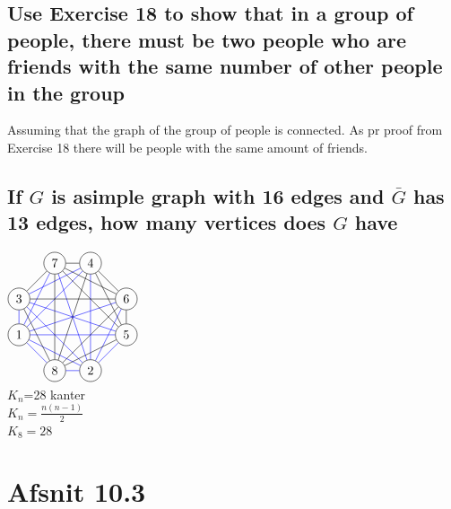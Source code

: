 \documentclass[12pt, a4paper]{report}
\begin{document}
		\subsection{Use Exercise 18 to show that in a group of people, there must be two people who are friends with the same number of other people in the group}
			Assuming that the graph of the group of people is connected. As pr proof from Exercise 18 there will be people with the same amount of friends.
		\setcounter{subsection}{61}
		\subsection{If $G$ is asimple graph with 16 edges and $\bar{G}$ has 13 edges, how many vertices does $G$ have}
			$\begin{tikzpicture}[scale=1]
				\tikzstyle{vertex}=[circle,draw=black]
				\node[vertex](v1) at (0,0){1};
				\node[vertex](v2) at (2,-1){2};
				\node[vertex](v3) at (0,1){3};
				\node[vertex](v4) at (2,2){4};
				\node[vertex](v5) at (3,0){5};

				\node[vertex](v6) at (3,1){6};
				\node[vertex](v7) at (1,2){7};
				\node[vertex](v8) at (1,-1){8};
				\path[-]
					(v1) edge[color=blue] node {}(v2)
					(v1) edge[color=blue] node {}(v3)
					(v1) edge[color=blue] node {}(v4)
					(v1) edge[color=blue] node {}(v5)
					(v1) edge[color=blue] node {}(v6)
					(v1) edge[color=blue] node {}(v7)
					(v1) edge[color=blue] node {}(v8)
					(v2) edge[color=blue] node {}(v3)
					(v2) edge[color=blue] node {}(v4)
					(v2) edge[color=blue] node {}(v5)
					(v2) edge[color=blue] node {}(v6)
					(v2) edge[color=blue] node {}(v7)
					(v2) edge[color=blue] node {}(v8)
					(v3) edge[color=blue] node {}(v4)
					(v3) edge[color=blue] node {}(v5)
					(v3) edge node {}(v6)
					(v3) edge node {}(v7)
					(v3) edge node {}(v8)
					(v4) edge node {}(v5)
					(v4) edge node {}(v6)
					(v4) edge node {}(v7)
					(v4) edge node {}(v8)
					(v5) edge node {}(v6)
					(v5) edge node {}(v7)
					(v5) edge node {}(v8)
					(v6) edge node {}(v7)
					(v6) edge node {}(v8)
					(v7) edge node {}(v8);
			\end{tikzpicture}$\\
			$K_n$=28 kanter\\
			$K_n=\frac{n(n-1)}{2}$\\
			$K_8=28$
	\section{Afsnit 10.3}
		\setcounter{subsection}{38}
\end{document}
